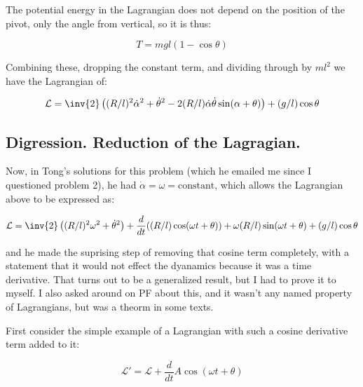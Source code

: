 \documentclass{article}
\newcommand{\LL}[0]{\mathcal{L}}
\newcommand{\dotalpha}[0]{\dot{\alpha}}
\newcommand{\dottheta}[0]{\dot{\theta}}
\begin{document}
The potential energy in the Lagrangian does not depend on the position of the pivot, only the angle from vertical, so it is thus:

\begin{equation*}
T = mg l ( 1 - \cos\theta )
\end{equation*}

Combining these, dropping the constant term, and dividing through by $ml^2$ we have the Lagrangian of:

\begin{equation*}
\LL = \inv{2} \left( (R/l)^2 \dotalpha^2 + \dottheta^2 - 2 (R/l) \dotalpha \dottheta \sin( \alpha +\theta ) \right) + (g/l) \cos\theta
\end{equation*}

\subsection{ Digression.  Reduction of the Lagragian. }

Now, in Tong's solutions for this problem (which he emailed me since I questioned problem 2), he had $\dotalpha = \omega = \text{constant}$, which allows the
Lagrangian above to be expressed as:

\begin{equation*}
\LL = 
\inv{2} \left( (R/l)^2 \omega^2 + \dottheta^2 \right) 
+ \frac{d}{dt} ((R/l) \cos( \omega t + \theta )) + \omega (R/l) \sin(\omega t + \theta)
+ (g/l) \cos\theta
\end{equation*}

and he made the suprising step of removing that cosine term completely, with a statement that it would not effect the dyanamics because it was a time derivative. 
That turns out to be a generalized result, but I had to prove it to myself.  I also asked around on PF about this, and it wasn't any named property of Lagrangians,
but was a theorm in some texts.

First consider the simple example of a Lagrangian with such a cosine derivative term added to it:

\begin{equation*}
\LL' = \LL + \frac{d}{dt} A \cos(\omega t + \theta)
\end{equation*}
\end{document}
